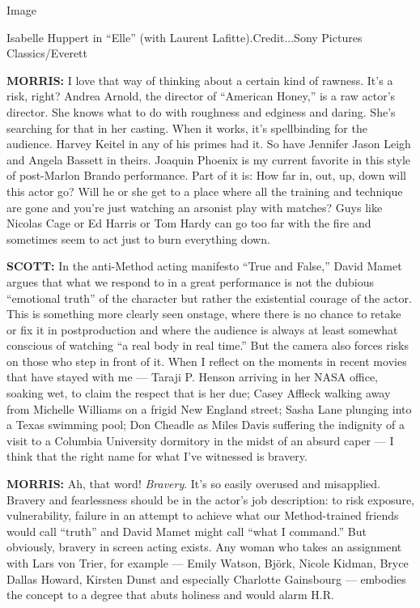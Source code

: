 Image

Isabelle Huppert in ``Elle'' (with Laurent Lafitte).Credit...Sony
Pictures Classics/Everett

\textbf{MORRIS:} I love that way of thinking about a certain kind of
rawness. It's a risk, right? Andrea Arnold, the director of ``American
Honey,'' is a raw actor's director. She knows what to do with roughness
and edginess and daring. She's searching for that in her casting. When
it works, it's spellbinding for the audience. Harvey Keitel in any of
his primes had it. So have Jennifer Jason Leigh and Angela Bassett in
theirs. Joaquin Phoenix is my current favorite in this style of
post-Marlon Brando performance. Part of it is: How far in, out, up, down
will this actor go? Will he or she get to a place where all the training
and technique are gone and you're just watching an arsonist play with
matches? Guys like Nicolas Cage or Ed Harris or Tom Hardy can go too far
with the fire and sometimes seem to act just to burn everything down.

\textbf{SCOTT:} In the anti-Method acting manifesto ``True and False,''
David Mamet argues that what we respond to in a great performance is not
the dubious ``emotional truth'' of the character but rather the
existential courage of the actor. This is something more clearly seen
onstage, where there is no chance to retake or fix it in postproduction
and where the audience is always at least somewhat conscious of watching
``a real body in real time.'' But the camera also forces risks on those
who step in front of it. When I reflect on the moments in recent movies
that have stayed with me --- Taraji P. Henson arriving in her NASA
office, soaking wet, to claim the respect that is her due; Casey Affleck
walking away from Michelle Williams on a frigid New England street;
Sasha Lane plunging into a Texas swimming pool; Don Cheadle as Miles
Davis suffering the indignity of a visit to a Columbia University
dormitory in the midst of an absurd caper --- I think that the right
name for what I've witnessed is bravery.

\textbf{MORRIS:} Ah, that word! \emph{Bravery}. It's so easily overused
and misapplied. Bravery and fearlessness should be in the actor's job
description: to risk exposure, vulnerability, failure in an attempt to
achieve what our Method-trained friends would call ``truth'' and David
Mamet might call ``what I command.'' But obviously, bravery in screen
acting exists. Any woman who takes an assignment with Lars von Trier,
for example --- Emily Watson, Björk, Nicole Kidman, Bryce Dallas Howard,
Kirsten Dunst and especially Charlotte Gainsbourg --- embodies the
concept to a degree that abuts holiness and would alarm H.R.

